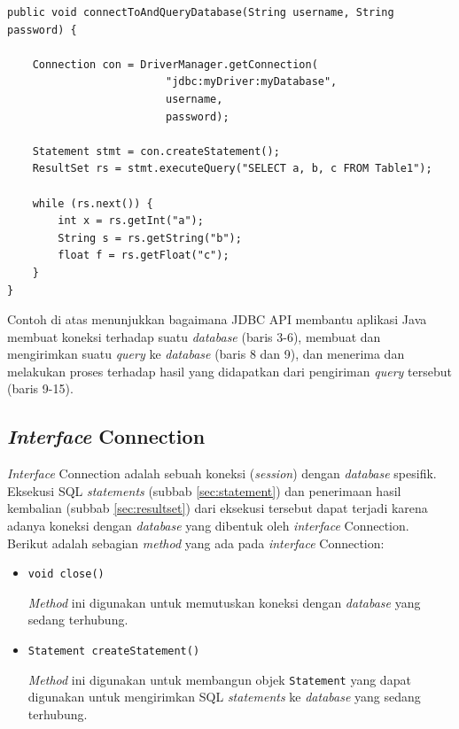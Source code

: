 \begin{lstlisting}
public void connectToAndQueryDatabase(String username, String password) {

    Connection con = DriverManager.getConnection(
                         "jdbc:myDriver:myDatabase",
                         username,
                         password);

    Statement stmt = con.createStatement();
    ResultSet rs = stmt.executeQuery("SELECT a, b, c FROM Table1");

    while (rs.next()) {
        int x = rs.getInt("a");
        String s = rs.getString("b");
        float f = rs.getFloat("c");
    }
}
\end{lstlisting}

Contoh di atas menunjukkan bagaimana JDBC API membantu aplikasi Java membuat koneksi terhadap suatu \textit{database} (baris 3-6), membuat dan mengirimkan suatu \textit{query} ke \textit{database} (baris 8 dan 9), dan menerima dan melakukan proses terhadap hasil yang didapatkan dari pengiriman \textit{query} tersebut (baris 9-15).

\subsection{\textit{Interface} Connection}
\label{sec:intercon}
\textit{Interface} Connection adalah sebuah koneksi (\textit{session}) dengan \textit{database} spesifik\cite{packagejavasql}. Eksekusi SQL \textit{statements} (subbab \ref{sec:statement}) dan penerimaan hasil kembalian (subbab \ref{sec:resultset}) dari eksekusi tersebut dapat terjadi karena adanya koneksi dengan \textit{database} yang dibentuk oleh \textit{interface} Connection. Berikut adalah sebagian \textit{method} yang ada pada \textit{interface} Connection:
\begin{itemize}
	\item \texttt{void close()}
	
	\textit{Method} ini digunakan untuk memutuskan koneksi dengan \textit{database} yang sedang terhubung.
	
	\item \texttt{Statement createStatement()}
	
	\textit{Method} ini digunakan untuk membangun objek \texttt{Statement} yang dapat digunakan untuk mengirimkan SQL \textit{statements} ke \textit{database} yang sedang terhubung.
\end{itemize}

